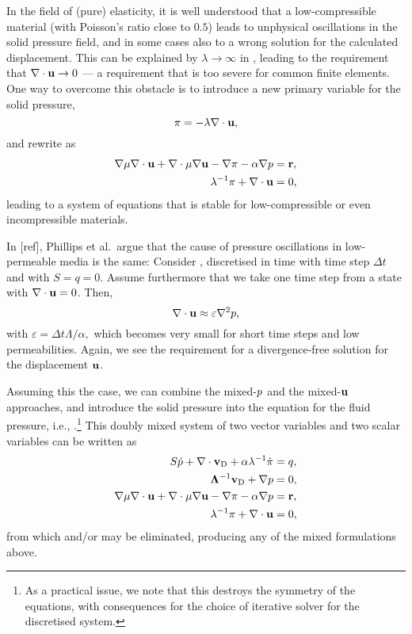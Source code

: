 In the field of (pure) elasticity, it is well understood that a
low-compressible material (with Poisson's ratio close to $0.5$) leads to
unphysical oscillations in the solid pressure field, and in some cases also to
a wrong solution for the calculated displacement.
This can be explained by $\lambda\rightarrow\infty$ in , leading to
the requirement that $\nabla\cdot\U\rightarrow 0$ --- a requirement that is too
severe for common finite elements.
One way to overcome this obstacle is to introduce a new primary variable for
the solid pressure,
\begin{equation}
\label{eq:s}
\Ps = -\lambda \nabla \cdot \U,
\end{equation}
and rewrite  as
\begin{align}
\nabla \mu \nabla \cdot \U + \nabla \cdot \mu \nabla \U
 - \nabla \Ps - \alpha \nabla \Pf &= \V{r},\\
\lambda^{-1}\Ps+\nabla\cdot\U &= 0,
\end{align}
leading to a system of equations that is stable for low-compressible or even
incompressible materials.

In [ref], Phillips et al.~argue that the cause of pressure oscillations in
low-permeable media is the same: Consider , discretised in time
with time step $\Delta t$ and with $S=q=0$.
Assume furthermore that we take one time step from a state with
$\nabla\cdot\U=0$.
Then,
\begin{equation}
  \nabla\cdot\U \approx \varepsilon \onabla^2 \Pf,
\end{equation}
with $\varepsilon=\Delta t \Lambda / \alpha,$ which becomes very small for
short time steps and low permeabilities.
Again, we see the requirement for a divergence-free solution for the
displacement $\mathbf{u}$.

Assuming this the case, we can combine the mixed-$p$ and the mixed-$\mathbf{u}$
approaches, and introduce the solid pressure into the equation for the fluid
pressure, i.e., .\footnote{As a practical issue, we note
  that this destroys the symmetry of the equations, with consequences for the
  choice of iterative solver for the discretised system.}
This doubly mixed system of two vector variables and two scalar variables can be
written as
\begin{align}
S\dot{\Pf} + \nabla \cdot \vD + \alpha \lambda^{-1} \dot{\Ps} &= q, \\
\label{eq:mixp}
  \Lambda^{-1} \vD + \nabla \Pf &= 0,\\
\nabla \mu \nabla \cdot \U + \nabla \cdot \mu \nabla \U
 - \nabla \Ps - \alpha \nabla \Pf &= \V{r},\\
\label{eq:mixu}
\lambda^{-1}\Ps+\nabla\cdot\U &= 0,
\end{align}
from which  and/or  may be eliminated, producing any of
the mixed formulations above.

